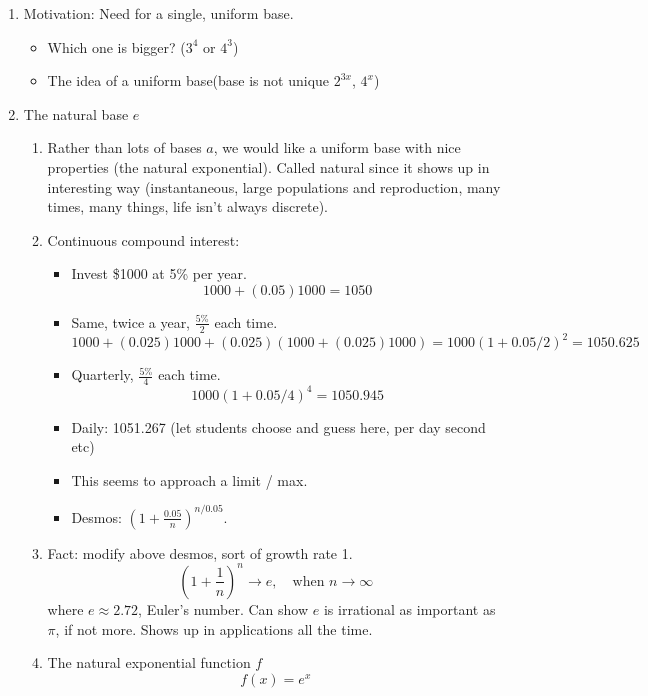 \documentclass{article}
\begin{document}
\begin{enumerate}

\item Motivation: Need for a single, uniform base.
\begin{itemize}
\item Which one is bigger? ($3^4$ or $4^3$)
\item The idea of a uniform base(base is not unique $2^{3x}$, $4^x$)
\end{itemize}

\item The natural base $e$
\begin{enumerate}
\item Rather than lots of bases $a$, we would like a uniform base with nice properties (the natural exponential). Called natural since it shows up in interesting way (instantaneous, large populations and reproduction, many times, many things, life isn't always discrete).
\item Continuous compound interest:
\begin{itemize}
\item Invest \$1000 at 5\% per year.
$$
1000 + (0.05)1000 = 1050
$$
\item Same, twice a year, $\frac{5\%}{2}$ each time.
$$
1000 + (0.025)1000 + (0.025)(1000 + (0.025)1000)  = 
1000(1+0.05/2)^2 = 1050.625
$$
\item Quarterly, $\frac{5\%}{4}$ each time.
$$
1000(1+0.05/4)^4 = 1050.945
$$
\item Daily: 1051.267 (let students choose and guess here, per day second etc)
\item This seems to approach a limit / max.
\item Desmos: $(1+\frac{0.05}{n})^{n/0.05}$. 
\end{itemize}
\item Fact: modify above desmos, sort of growth rate 1.
$$
(1+\frac{1}{n})^n \rightarrow e,\quad\text{when } n\rightarrow \infty  
$$
where $e\approx 2.72$, Euler's number. Can show $e$ is irrational as important as $\pi$, if not more. Shows up in applications all the time. 
\item The natural exponential function $f$
$$
f(x) = e^x
$$
\end{enumerate}


\end{enumerate}
\end{document}
